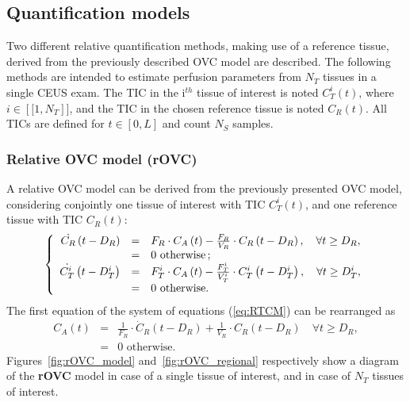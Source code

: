 \subsection{Quantification models}
Two different relative quantification methods, making use of a reference tissue, derived from the previously described OVC model are described. 
The following methods are intended to estimate perfusion parameters from $N_T$ tissues in a single CEUS exam.
The TIC in the i$^{th}$ tissue of interest is noted $C_T^i(t)$, where $i \in \left[\![1,N_T \right]\!]$, and the TIC in the chosen reference tissue is noted $C_R(t)$. All TICs are defined for $t \in \left[ 0, L \right]$ and count $N_S$ samples.

\subsubsection{Relative OVC model (rOVC)}
A relative OVC model can be derived from the previously presented OVC model, considering conjointly one tissue of interest with TIC $C_T^i(t)$, and one reference tissue with TIC $C_R(t)$:
\begin{equation}
\left\{
\begin{array}{r c l}
\dot{C_R} \left( t - D_R \right) &=& F_R \cdot C_A \left( t \right) - \frac{F_R}{V_R} \cdot C_R \left( t - D_R \right), \quad \forall t \geq D_R,  \\
 &=& 0 \textrm{ otherwise\,;} \\
\dot{C_T^i} \left( t - D_T^i \right) &=& F_T^i \cdot C_A \left( t \right) - \frac{F_T^i}{V_T^i} \cdot C_T^i \left( t - D_T^i \right), \quad \forall t \geq D_T^i,  \\
 &=& 0 \textrm{ otherwise.}
\end{array}
\right.
\label{eq:RTCM}
\end{equation}
The first equation of the system of equations (\ref{eq:RTCM}) can be rearranged as
\begin{equation}
\begin{array}{rcl}
C_A(t) &=&\frac{1}{F_{R}} \cdot \dot{C}_{R}(t - D_{R}) + \frac{1}{V_{R}} \cdot {C_{R}}(t - D_R) \quad\forall t \geq D_{R}, \\
&=& \textrm{0 otherwise.}
\end{array}
\label{eq:CACM}
\end{equation}
Figures~\ref{fig:rOVC_model} and~\ref{fig:rOVC_regional} respectively show a diagram of the \textbf{rOVC} model in case of a single tissue of interest, and in case of $N_T$ tissues of interest.

